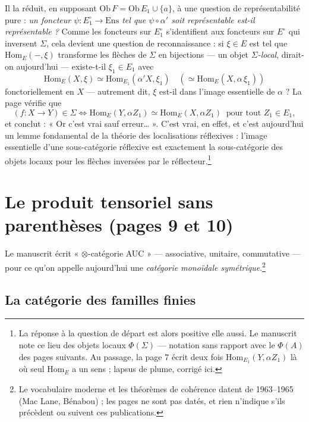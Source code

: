 \documentclass[11pt,a4paper]{article}
\begin{document}
Il la réduit, en supposant $\mathrm{Ob}\,F = \mathrm{Ob}\,E_1 \cup \{a\}$,
à une question de représentabilité pure : \emph{un foncteur
$\psi : E_1^{\circ} \to \mathrm{Ens}$ tel que $\psi \circ \alpha'$ soit
représentable est-il représentable ?} Comme les foncteurs sur
$E_1^{\circ}$ s'identifient aux foncteurs sur $E^{\circ}$ qui inversent
$\Sigma$, cela devient une question de reconnaissance : si
$\xi \in E$ est tel que $\mathrm{Hom}_E(-, \xi)$ transforme les flèches de
$\Sigma$ en bijections — un objet \emph{$\Sigma$-local}, dirait-on
aujourd'hui — existe-t-il $\xi_1 \in E_1$ avec
\[
\mathrm{Hom}_E(X, \xi) \simeq \mathrm{Hom}_{E_1}(\alpha' X, \xi_1)
\quad (\simeq \mathrm{Hom}_E(X, \alpha\,\xi_1))
\]
fonctoriellement en $X$ — autrement dit, $\xi$ est-il dans l'image
essentielle de $\alpha$ ? La page vérifie que
\[
(f : X \to Y) \in \Sigma \iff
\mathrm{Hom}_E(Y, \alpha Z_1) \simeq \mathrm{Hom}_E(X, \alpha Z_1)
\ \text{ pour tout } Z_1 \in E_1,
\]
et conclut : « Or c'est vrai sauf erreur… ». C'est vrai, en effet, et c'est
aujourd'hui un lemme fondamental de la théorie des localisations
réflexives : l'image essentielle d'une sous-catégorie réflexive est
exactement la sous-catégorie des objets locaux pour les flèches inversées
par le réflecteur.\footnote{La réponse à la question de départ est alors
positive elle aussi. Le manuscrit note ce lieu des objets locaux
$\Phi(\Sigma)$ — notation sans rapport avec le $\Phi(A)$ des pages
suivants. Au passage, la page 7 écrit deux fois
$\mathrm{Hom}_{E_1}(Y, \alpha Z_1)$ là où seul $\mathrm{Hom}_E$ a un sens ;
lapsus de plume, corrigé ici.}

\section*{Le produit tensoriel sans parenthèses (pages 9 et 10)}

Le manuscrit écrit « $\otimes$-catégorie AUC » — associative, unitaire,
commutative — pour ce qu'on appelle aujourd'hui une \emph{catégorie
monoïdale symétrique}.\footnote{Le vocabulaire moderne et les théorèmes de
cohérence datent de 1963--1965 (Mac Lane, Bénabou) ; les pages ne sont
pas datés, et rien n'indique s'ils précèdent ou suivent ces publications.}

\subsection*{La catégorie des familles finies}
\end{document}
